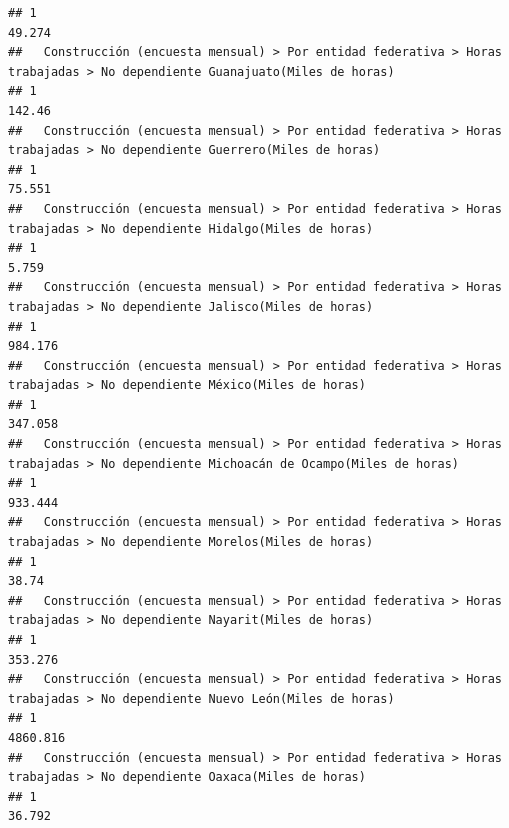 \documentclass[
]{article}
\begin{document}
\begin{verbatim}
## 1                                                                                                                49.274
##   Construcción (encuesta mensual) > Por entidad federativa > Horas trabajadas > No dependiente Guanajuato(Miles de horas) 
## 1                                                                                                                   142.46
##   Construcción (encuesta mensual) > Por entidad federativa > Horas trabajadas > No dependiente Guerrero(Miles de horas) 
## 1                                                                                                                 75.551
##   Construcción (encuesta mensual) > Por entidad federativa > Horas trabajadas > No dependiente Hidalgo(Miles de horas) 
## 1                                                                                                                 5.759
##   Construcción (encuesta mensual) > Por entidad federativa > Horas trabajadas > No dependiente Jalisco(Miles de horas) 
## 1                                                                                                               984.176
##   Construcción (encuesta mensual) > Por entidad federativa > Horas trabajadas > No dependiente México(Miles de horas) 
## 1                                                                                                              347.058
##   Construcción (encuesta mensual) > Por entidad federativa > Horas trabajadas > No dependiente Michoacán de Ocampo(Miles de horas) 
## 1                                                                                                                           933.444
##   Construcción (encuesta mensual) > Por entidad federativa > Horas trabajadas > No dependiente Morelos(Miles de horas) 
## 1                                                                                                                 38.74
##   Construcción (encuesta mensual) > Por entidad federativa > Horas trabajadas > No dependiente Nayarit(Miles de horas) 
## 1                                                                                                               353.276
##   Construcción (encuesta mensual) > Por entidad federativa > Horas trabajadas > No dependiente Nuevo León(Miles de horas) 
## 1                                                                                                                 4860.816
##   Construcción (encuesta mensual) > Por entidad federativa > Horas trabajadas > No dependiente Oaxaca(Miles de horas) 
## 1                                                                                                               36.792

\end{verbatim}
\end{document}
